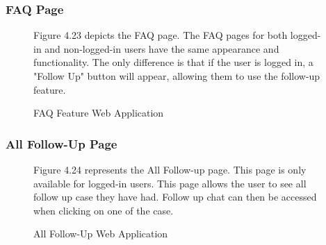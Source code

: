 \documentclass[12pt,oneside,openright,a4paper]{cpe-english-project}
\begin{document}
        \subsubsection{FAQ Page}
          \begin{figure}[!h]
            \centering
            \caption{FAQ Feature Web Application}\label{fig:WebAppFAQ}
            \begin{flushleft}
              \qquad Figure 4.23 depicts the FAQ page. The FAQ pages for both logged-in and non-logged-in users have the same appearance and functionality. The only difference is that if the user is logged in, a "Follow Up" button will appear, allowing them to use the follow-up feature.\par
            \end{flushleft}        
          \end{figure}
        \subsubsection{All Follow-Up Page}
          \begin{figure}[!h]
            \centering
            \caption{All Follow-Up Web Application}\label{fig:WebAppAllFollowUp}
            \begin{flushleft}
              \qquad Figure 4.24 represents the All Follow-up page. This page is only available for logged-in users. This page allows the user to see all follow up case they have had. Follow up chat can then be accessed when clicking on one of the case.\par
            \end{flushleft}        
          \end{figure}
\end{document}
